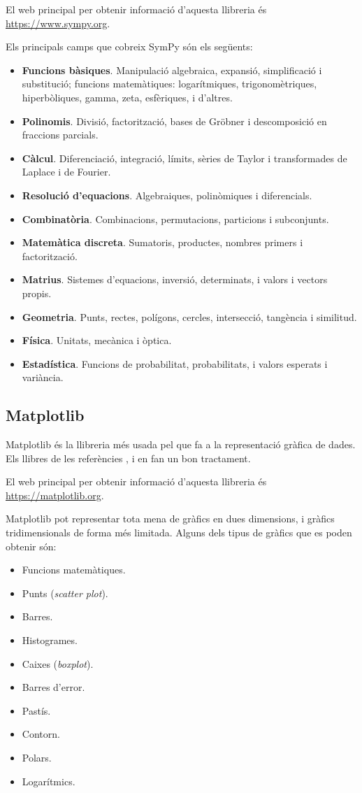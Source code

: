 El  web principal per obtenir informació d'aquesta llibreria és
\href{https://www.sympy.org/}{https://www.sympy.org}.

Els principals camps que cobreix SymPy són els següents:
\begin{itemize}
	\item \textbf{Funcions bàsiques}. Manipulació algebraica, expansió, simplificació i substitució; funcions matemàtiques: logarítmiques, trigonomètriques, hiperbòliques, gamma, zeta, esfèriques,  i d'altres.
	\item \textbf{Polinomis}. Divisió, factorització, 	 bases de Gröbner i descomposició en fraccions parcials.
	\item \textbf{Càlcul}. Diferenciació, integració, límits, sèries de Taylor i transformades de Laplace i de Fourier.
	\item \textbf{Resolució d'equacions}. Algebraiques, polinòmiques i diferencials.
	\item \textbf{Combinatòria}. Combinacions, permutacions, particions i subconjunts.
	\item \textbf{Matemàtica discreta}. Sumatoris, productes, nombres primers i factorització.
	\item \textbf{Matrius}. Sistemes d'equacions, inversió, determinats, i valors i vectors propis.
	\item \textbf{Geometria}. Punts, rectes, polígons, cercles, intersecció, tangència i similitud.
	\item \textbf{Física}. Unitats, mecànica i òptica.
	\item \textbf{Estadística}. Funcions de probabilitat, probabilitats, i valors esperats  i variància.
\end{itemize}


\subsection{Matplotlib}

Matplotlib és la llibreria més usada pel que fa a la representació gràfica de dades. Els llibres de les referències \cite{JOH}, \cite{HIL} i \cite{VAN} en fan un bon tractament.

El  web principal per obtenir informació d'aquesta llibreria és \href{https://matplotlib.org/}{https://matplotlib.org}.

Matplotlib pot representar tota mena de gràfics en dues dimensions, i gràfics  tridimensionals de forma més limitada. Alguns dels tipus de gràfics que es poden obtenir són:
\begin{itemize}
	\item Funcions matemàtiques.
	\item Punts (\textit{scatter plot}).
	\item Barres.
	\item Histogrames.
	\item Caixes (\textit{boxplot}).
	\item Barres d'error.
	\item Pastís.
	\item Contorn.
	\item Polars.
	\item Logarítmics.
\end{itemize}

